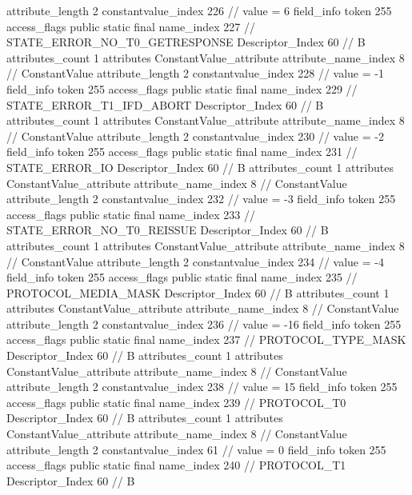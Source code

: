 {{{{{{{					attribute_length	2
					constantvalue_index	226		// value = 6
				}
				}
			}
			field_info {
				token	255
				access_flags	public static final
				name_index	227		// STATE_ERROR_NO_T0_GETRESPONSE
				Descriptor_Index	60		// B
				attributes_count	1
				attributes {
				ConstantValue_attribute {
					attribute_name_index	8		// ConstantValue
					attribute_length	2
					constantvalue_index	228		// value = -1
				}
				}
			}
			field_info {
				token	255
				access_flags	public static final
				name_index	229		// STATE_ERROR_T1_IFD_ABORT
				Descriptor_Index	60		// B
				attributes_count	1
				attributes {
				ConstantValue_attribute {
					attribute_name_index	8		// ConstantValue
					attribute_length	2
					constantvalue_index	230		// value = -2
				}
				}
			}
			field_info {
				token	255
				access_flags	public static final
				name_index	231		// STATE_ERROR_IO
				Descriptor_Index	60		// B
				attributes_count	1
				attributes {
				ConstantValue_attribute {
					attribute_name_index	8		// ConstantValue
					attribute_length	2
					constantvalue_index	232		// value = -3
				}
				}
			}
			field_info {
				token	255
				access_flags	public static final
				name_index	233		// STATE_ERROR_NO_T0_REISSUE
				Descriptor_Index	60		// B
				attributes_count	1
				attributes {
				ConstantValue_attribute {
					attribute_name_index	8		// ConstantValue
					attribute_length	2
					constantvalue_index	234		// value = -4
				}
				}
			}
			field_info {
				token	255
				access_flags	public static final
				name_index	235		// PROTOCOL_MEDIA_MASK
				Descriptor_Index	60		// B
				attributes_count	1
				attributes {
				ConstantValue_attribute {
					attribute_name_index	8		// ConstantValue
					attribute_length	2
					constantvalue_index	236		// value = -16
				}
				}
			}
			field_info {
				token	255
				access_flags	public static final
				name_index	237		// PROTOCOL_TYPE_MASK
				Descriptor_Index	60		// B
				attributes_count	1
				attributes {
				ConstantValue_attribute {
					attribute_name_index	8		// ConstantValue
					attribute_length	2
					constantvalue_index	238		// value = 15
				}
				}
			}
			field_info {
				token	255
				access_flags	public static final
				name_index	239		// PROTOCOL_T0
				Descriptor_Index	60		// B
				attributes_count	1
				attributes {
				ConstantValue_attribute {
					attribute_name_index	8		// ConstantValue
					attribute_length	2
					constantvalue_index	61		// value = 0
				}
				}
			}
			field_info {
				token	255
				access_flags	public static final
				name_index	240		// PROTOCOL_T1
				Descriptor_Index	60		// B
}}}}}
